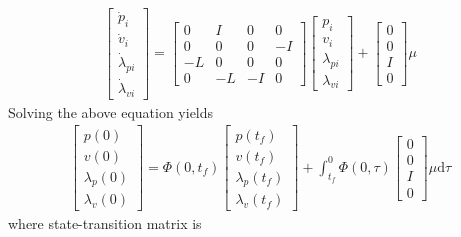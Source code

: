 \documentclass[letterpaper, 10 pt, conference,onecolumn]{ieeeconf}  %
\begin{document}
\begin{align*}
\begin{bmatrix}
\dot{p}_i\\
\dot{v}_i\\
\dot{\lambda}_{pi}\\
\dot{\lambda}_{vi}
\end{bmatrix}=\begin{bmatrix}
0&I&0&0\\
0&0&0&-I\\
-L&0&0&0\\
0&-L&-I&0
\end{bmatrix}\begin{bmatrix}
p_i\\
v_i\\
\lambda_{pi}\\
\lambda_{vi}
\end{bmatrix}+\begin{bmatrix}
0\\
0\\
I\\
0
\end{bmatrix}\mu
\end{align*}
Solving the above equation yields
\begin{align*}
\begin{bmatrix}
p(0)\\
v(0)\\
\lambda_{p}(0)\\
\lambda_v(0)
\end{bmatrix}=\Phi(0,t_f)\begin{bmatrix}
p(t_f)\\
v(t_f)\\
\lambda_{p}(t_f)\\
\lambda_v(t_f)
\end{bmatrix}+\int^0_{t_f}\Phi(0,\tau)\begin{bmatrix}
0\\
0\\
I\\
0
\end{bmatrix}\mu\mbox{d}\tau
\end{align*}
where state-transition matrix is
\end{document}

